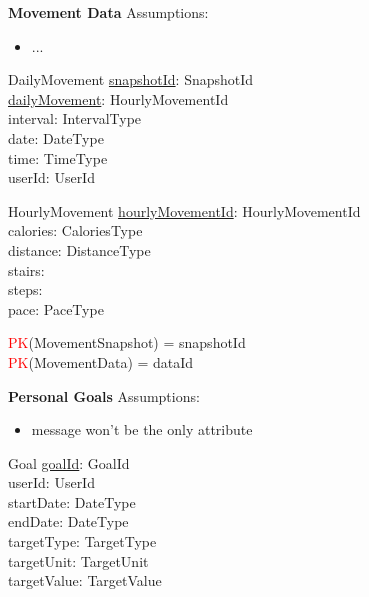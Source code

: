 \documentclass{article}
\begin{document}
\vspace{0.2cm}
\hspace{-0.5cm}\textbf{Movement Data}
\newline \newline Assumptions:
\begin{itemize}
  \item ...
\end{itemize}

\begin{schema}{DailyMovement}
	\underline{snapshotId}: SnapshotId \\
    \underline{dailyMovement}: HourlyMovementId \\
    interval: IntervalType \\
    date: DateType \\
    time: TimeType \\
    userId: UserId \\
\end{schema}

\begin{schema}{HourlyMovement}
    \underline{hourlyMovementId}: HourlyMovementId \\
    calories: CaloriesType \\
    distance: DistanceType \\ 
    stairs: \nat \\
    steps: \nat \\
    pace: PaceType \\
\end{schema}

\begin{zed}
\textcolor{red}{PK}(MovementSnapshot) = { snapshotId } \\
\textcolor{red}{PK}(MovementData) = { dataId } \\
\end{zed}
    

\vspace{0.2cm}
\hspace{-0.5cm}\textbf{Personal Goals}
\newline \newline Assumptions:
\begin{itemize}
  \item message won't be the only attribute 
\end{itemize}

\begin{schema}{Goal}
	\underline{goalId}: GoalId \\
    userId: UserId \\
    startDate: DateType \\
    endDate: DateType \\ 
    targetType: TargetType \\
    targetUnit: TargetUnit \\
    targetValue: TargetValue \\ 
\end{schema}
\end{document}
